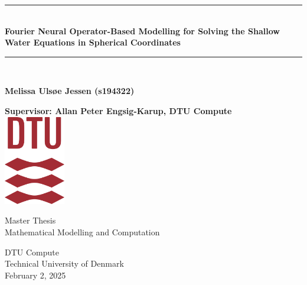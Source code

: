 \begin{titlepage}
\newcommand{\HRule}{\rule{\linewidth}{0.5mm}} 


    \begin{center}
        
        \HRule\\[0.4cm]
        
        {\huge\bfseries Fourier Neural Operator-Based Modelling for Solving the Shallow Water Equations in Spherical Coordinates}\\[0.4cm]
        


        \HRule\\[1.5cm]
 


        \vspace{1.1cm}
 
        \textbf{Melissa Ulsøe Jessen (s194322)}
        
        \vspace{1.1cm}
 
        \textbf{Supervisor: Allan Peter Engsig-Karup,  DTU Compute}\\

             
        \vspace{1.5cm}
        \includegraphics[width=0.2\textwidth]{figs/DTU.png}
             
         \vspace{1cm}
             
         Master Thesis\\
         Mathematical Modelling and Computation\\   
         
         \vfill
             
        DTU Compute\\
        Technical University of Denmark\\
        February 2, 2025
             
    \end{center}
 \end{titlepage}

